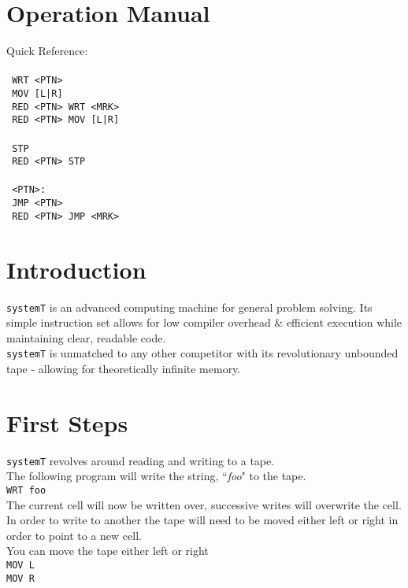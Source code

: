 \documentclass{article}
\begin{document}
    \section{Operation Manual}
    Quick Reference:\\~\\
    \texttt{ WRT <PTN> }\\
    \texttt{ MOV [L|R] }\\
    \texttt{ RED <PTN> WRT <MRK> }\\
    \texttt{ RED <PTN> MOV [L|R] }\\~\\
    \texttt{ STP }\\
    \texttt{ RED <PTN> STP }\\~\\
    \texttt{ <PTN>: }\\
    \texttt{ JMP <PTN>}\\
    \texttt{ RED <PTN> JMP <MRK>}

    \section{Introduction}
    \texttt{systemT} is an advanced computing machine for general problem solving. 
    Its simple instruction set allows for low compiler overhead \& efficient execution while maintaining clear, readable code.  \\
    \texttt{systemT} is unmatched to any other competitor with its revolutionary 
    unbounded tape - allowing for theoretically infinite memory.

    \section{First Steps}
    \texttt{systemT} revolves around reading and writing to a tape. \\
    The following program will write the string, ``{\it foo}" to the tape.\\ 
    \indent \texttt{WRT foo}\\

    The current cell will now be written over, successive writes will overwrite the
    cell. In order to write to another the tape will need to be moved either left 
    or right in order to point to a new cell.\\
    You can move the tape either left or right\\
    \indent \texttt{MOV L}\\
    \indent \texttt{MOV R}\\
\end{document}

